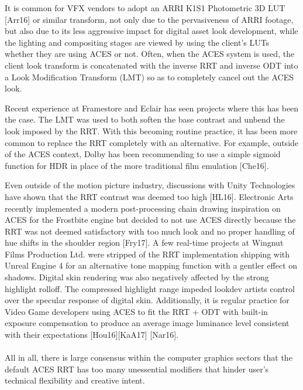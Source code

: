 \documentclass[conference]{IEEEtran}
\begin{document}
It is common for VFX vendors to adopt an ARRI K1S1 Photometric 3D LUT [Arr16] or similar transform, not only due to the pervasiveness of ARRI footage, but also due to its less aggressive impact for digital asset look development, while the lighting and compositing stages are viewed by using the client's LUTs whether they are using ACES or not. Often, when the ACES system is used, the client look transform is concatenated with the inverse RRT and inverse ODT into a Look Modification Transform (LMT) so as to completely cancel out the ACES look.

Recent experience at Framestore and Eclair has seen projects where this has been the case. The LMT was used to both soften the base contrast and unbend the look imposed by the RRT. With this becoming routine practice, it has been more common to replace the RRT completely with an alternative. For example, outside of the ACES context, Dolby has been recommending to use a simple sigmoid function for HDR in place of the more traditional film emulation [Che16].

Even outside of the motion picture industry, discussions with Unity Technologies have shown that the RRT contrast was deemed too high [HL16]. Electronic Arts recently implemented a modern post-processing chain drawing inspiration on ACES for the Frostbite engine but decided to not use ACES directly because the RRT was not deemed satisfactory with too much look and no proper handling of hue shifts in the shoulder region [Fry17]. A few real-time projects at Wingnut Films Production Ltd. were stripped of the RRT implementation shipping with Unreal Engine 4 for an alternative tone mapping function with a gentler effect on shadows. Digital skin rendering was also negatively affected by the strong highlight rolloff. The compressed highlight range impeded lookdev artists control over the specular response of digital skin. Additionally, it is regular practice for Video Game developers using ACES to fit the RRT + ODT with built-in exposure compensation to produce an average image luminance level consistent with their expectations [Hou16][KaA17] [Nar16].
\\ \\
All in all, there is large consensus within the computer graphics sectors that the default ACES RRT has too many unessential modifiers that hinder user's technical flexibility and creative intent.
\end{document}
